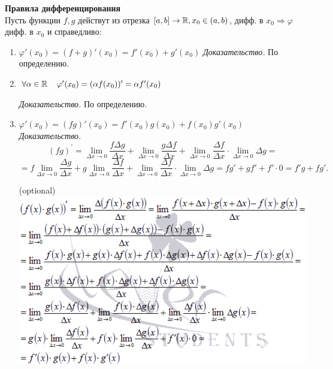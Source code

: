 \textbf{Правила дифференцирования} \\
Пусть функции $f, g$ действут из отрезка $[a, b] \rightarrow \operatorname*{\mathbb{R}}, x_0 \in (a, b)$, дифф. в $x_0 \Rightarrow \varphi$ дифф. в $x_0$ и справедливо:
\begin{enumerate}
    \item $\varphi'(x_0) = (f+g)'(x_0)=f'(x_0)+g'(x_0)$
    \textit{Доказательство.} По определению.
    
    \item $\forall \alpha \in \operatorname*{\mathbb{R}} \quad \varphi'(x_0) = (\alpha f(x_0))'= \alpha f'(x_0)$
     
    \textit{Доказательство.} По определению.
     
    \item $\varphi'(x_0) = (fg)'(x_0)=f'(x_0)g(x_0)+f(x_0)g'(x_0)$
    \textit{Доказательство.} \\
     $${{\left( {fg} \right)^\prime } = \lim\limits_{\Delta x \to 0} \frac{{f\Delta g}}{{\Delta x}} + \lim\limits_{\Delta x \to 0} \frac{{g\Delta f}}{{\Delta x}} + \lim\limits_{\Delta x \to 0} \frac{{\Delta f}}{{\Delta x}} \cdot \lim\limits_{\Delta x \to 0} \Delta g } = $$
     $$= {f\lim\limits_{\Delta x \to 0} \frac{{\Delta g}}{{\Delta x}} + g\lim\limits_{\Delta x \to 0} \frac{{\Delta f}}{{\Delta x}} + \lim\limits_{\Delta x \to 0} \frac{{\Delta f}}{{\Delta x}} \cdot \lim\limits_{\Delta x \to 0} \Delta g } = {fg' + gf' + f' \cdot 0 } = {f'g + fg'.}$$
      
    (optional) \\
    \includegraphics[scale=0.5]{Images/производная произведения.png}
      

\end{enumerate}
